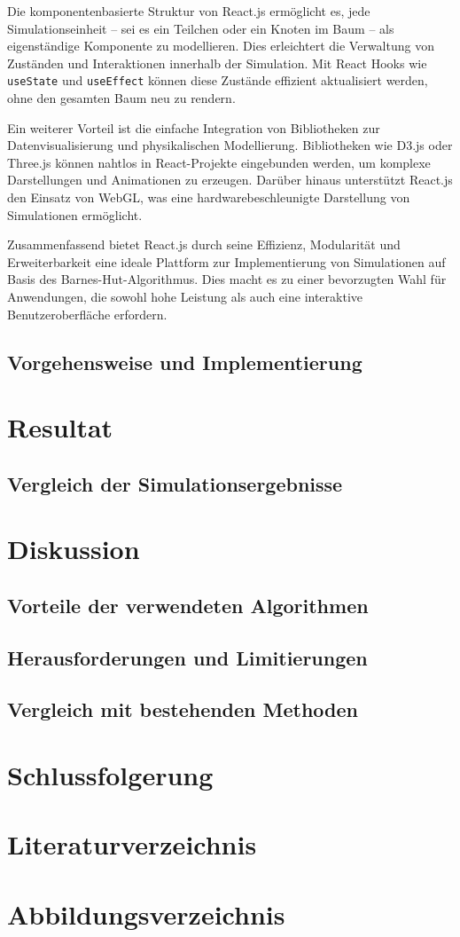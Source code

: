 \documentclass[a4paper,12pt,twoside]{article}
\begin{document}
Die komponentenbasierte Struktur von React.js ermöglicht es, jede Simulationseinheit -- sei es ein Teilchen oder ein Knoten im Baum -- als eigenständige Komponente zu modellieren. Dies erleichtert die Verwaltung von Zuständen und Interaktionen innerhalb der Simulation. Mit React Hooks wie \texttt{useState} und \texttt{useEffect} können diese Zustände effizient aktualisiert werden, ohne den gesamten Baum neu zu rendern.

Ein weiterer Vorteil ist die einfache Integration von Bibliotheken zur Datenvisualisierung und physikalischen Modellierung. Bibliotheken wie D3.js oder Three.js können nahtlos in React-Projekte eingebunden werden, um komplexe Darstellungen und Animationen zu erzeugen. Darüber hinaus unterstützt React.js den Einsatz von WebGL, was eine hardwarebeschleunigte Darstellung von Simulationen ermöglicht.

Zusammenfassend bietet React.js durch seine Effizienz, Modularität und Erweiterbarkeit eine ideale Plattform zur Implementierung von Simulationen auf Basis des Barnes-Hut-Algorithmus. Dies macht es zu einer bevorzugten Wahl für Anwendungen, die sowohl hohe Leistung als auch eine interaktive Benutzeroberfläche erfordern.

\subsection{Vorgehensweise und Implementierung}

\section{Resultat}
\subsection{Vergleich der Simulationsergebnisse}

\section{Diskussion}
\subsection{Vorteile der verwendeten Algorithmen}
\subsection{Herausforderungen und Limitierungen}
\subsection{Vergleich mit bestehenden Methoden}

\section{Schlussfolgerung}
\section{Literaturverzeichnis}
\section{Abbildungsverzeichnis}
\end{document}
